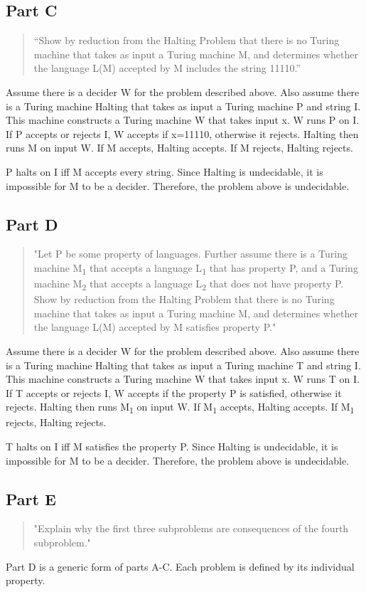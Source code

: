 \documentclass{article}
\begin{document}
\subsection{Part C}
\begin{quote}
``Show by reduction from the Halting Problem that there is no Turing machine that takes as input a Turing machine M, and determines whether the language L(M) accepted by M includes the string 11110.''
\end{quote}
Assume there is a decider W for the problem described above.  Also assume there is a Turing machine Halting that takes as input a Turing machine P and string I.  This machine constructs a Turing machine W that takes input x.  W runs P on I.  If P accepts or rejects I, W accepts if x=11110, otherwise it rejects.  Halting then runs M on input W.  If M accepts, Halting accepts.  If M rejects, Halting rejects.

P halts on I iff M accepts every string.  Since Halting is undecidable, it is impossible for M to be a decider.  Therefore, the problem above is undecidable.

\subsection{Part D}
\begin{quote}
"Let P be some property of languages.  Further assume there is a Turing machine M\textsubscript{1} that accepts a language L\textsubscript{1} that has property P, and a Turing machine M\textsubscript{2} that accepts a language L\textsubscript{2} that does not have property P.  Show by reduction from the Halting Problem that there is no Turing machine that takes as input a Turing machine M, and determines whether the language L(M) accepted by M satisfies property P."
\end{quote}
Assume there is a decider W for the problem described above.  Also assume there is a Turing machine Halting that takes as input a Turing machine T and string I.  This machine constructs a Turing machine W that takes input x.  W runs T on I.  If T accepts or rejects I, W accepts if the property P is satisfied, otherwise it rejects.  Halting then runs M\textsubscript{1} on input W.  If M\textsubscript{1} accepts, Halting accepts.  If M\textsubscript{1} rejects, Halting rejects.

T halts on I iff M satisfies the property P.  Since Halting is undecidable, it is impossible for M to be a decider.  Therefore, the problem above is undecidable.

\subsection{Part E}
\begin{quote}
"Explain why the first three subproblems are consequences of the fourth subproblem."
\end{quote}
Part D is a generic form of parts A-C.  Each problem is defined by its individual property.
\end{document}
